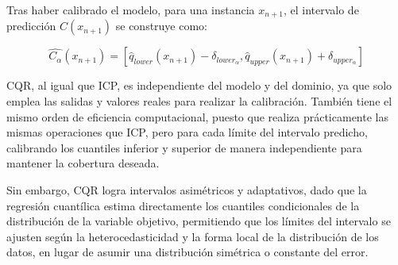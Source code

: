 Tras haber calibrado el modelo, para una instancia $x_{n+1}$, el intervalo de predicción $C(x_{n+1})$ se
construye como:

$$
\hat{C_\alpha}(x_{n+1}) = 
        \left[ 
            \hat{q}_{lower}(x_{n+1}) - \delta_{lower_\alpha}, 
            \hat{q}_{upper}(x_{n+1}) + \delta_{upper_\alpha}
        \right]
$$

CQR, al igual que ICP, es independiente del modelo y del dominio, ya que solo emplea las salidas y 
valores reales para realizar la calibración. También tiene el mismo orden de eficiencia computacional, puesto 
que realiza prácticamente las mismas operaciones que ICP, pero para cada límite del intervalo predicho, 
calibrando los cuantiles inferior y superior de manera independiente para mantener la cobertura deseada.

Sin embargo, CQR logra intervalos asimétricos y adaptativos, dado que la regresión cuantílica
estima directamente los cuantiles condicionales de la distribución de la variable objetivo,
permitiendo que los límites del intervalo se ajusten según la heterocedasticidad y la forma local de la 
distribución de los datos, en lugar de asumir una distribución simétrica o constante del error. 









